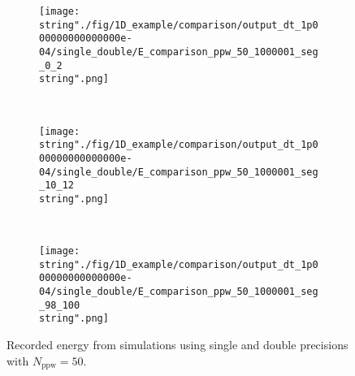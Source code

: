 \begin{minipage}[t]{.5\textwidth}
%
\begin{figure}[H]
\captionsetup{width=0.95\textwidth,font=footnotesize,labelfont=footnotesize}
\centering
%
\begin{subfigure}[b]{1\textwidth}
%
\centering\texttt{[image: \\string"./fig/1D\_example/comparison/output\_dt\_1p000000000000000e-04/single\_double/E\_comparison\_ppw\_50\_1000001\_seg\_0\_2\\string".png]}
%
\end{subfigure}\hfill
\\[2ex]
%
\begin{subfigure}[b]{1\textwidth}
%
\centering\texttt{[image: \\string"./fig/1D\_example/comparison/output\_dt\_1p000000000000000e-04/single\_double/E\_comparison\_ppw\_50\_1000001\_seg\_10\_12\\string".png]}
%
\end{subfigure}\hfill
\\[2ex]
%
\begin{subfigure}[b]{1\textwidth}
%
\centering\texttt{[image: \\string"./fig/1D\_example/comparison/output\_dt\_1p000000000000000e-04/single\_double/E\_comparison\_ppw\_50\_1000001\_seg\_98\_100\\string".png]}
%
\end{subfigure}\hfill
%
\caption{Recorded energy from simulations using single and double precisions with $N_\text{ppw}=50$.}
\label{comparison_E_single_double_segments_ppw_50}
\end{figure}
%
\end{minipage}
